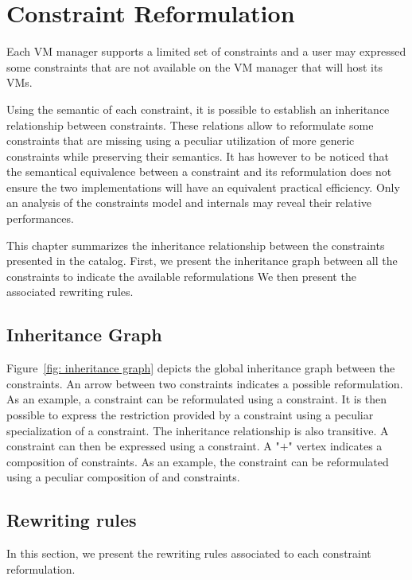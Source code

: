 \chapter{Constraint Reformulation}
\label{ch: inheritance}

Each VM manager supports a limited set of constraints and a user may  expressed some
constraints that are not available on the VM manager that will host its VMs.

Using the semantic of each constraint, it is possible to establish an inheritance relationship
between constraints. These relations allow to reformulate some constraints that are missing
using a peculiar utilization of more generic constraints while preserving their semantics.
It has however to be noticed that the semantical equivalence between a constraint
and its reformulation  does not ensure the two implementations will have an equivalent 
practical efficiency. Only an analysis of the constraints model and internals may reveal
their relative performances.

This chapter summarizes the inheritance relationship between the constraints presented
in the catalog. First, we present the inheritance graph between all the constraints
to indicate the available reformulations We then present the associated rewriting rules.

\section{Inheritance Graph}

Figure~\ref{fig: inheritance graph} depicts the global inheritance graph between the constraints. 
An arrow between two constraints indicates a possible reformulation.
As an example, a  constraint can be reformulated using a  constraint.
It is then possible to express the restriction provided by a  constraint using a
peculiar specialization of a  constraint.
The inheritance relationship is also transitive. A  constraint can then
be expressed using a  constraint.
%
A "$+$" vertex indicates a composition of constraints. As an example, the 
constraint can be reformulated using a peculiar composition of  and  constraints. 


\section{Rewriting rules}

In this section, we present the rewriting rules associated to each constraint reformulation.
\printListOfInheritances